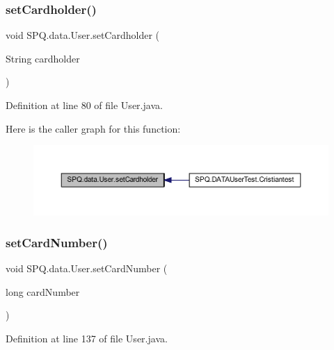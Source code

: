 \subsubsection{\texorpdfstring{set\+Cardholder()}{setCardholder()}}
{\footnotesize\ttfamily void S\+P\+Q.\+data.\+User.\+set\+Cardholder (\begin{DoxyParamCaption}\item[{String}]{cardholder }\end{DoxyParamCaption})}



Definition at line 80 of file User.\+java.

Here is the caller graph for this function\+:
\nopagebreak
\begin{figure}[H]
\begin{center}
\leavevmode
\includegraphics[width=350pt]{class_s_p_q_1_1data_1_1_user_a0fe49415c82bbbbfa0b22822f054157f_icgraph}
\end{center}
\end{figure}
\mbox{\label{class_s_p_q_1_1data_1_1_user_a6d98a72cb61e95f5417e10e0ba80afab}} 
\subsubsection{\texorpdfstring{set\+Card\+Number()}{setCardNumber()}}
{\footnotesize\ttfamily void S\+P\+Q.\+data.\+User.\+set\+Card\+Number (\begin{DoxyParamCaption}\item[{long}]{card\+Number }\end{DoxyParamCaption})}



Definition at line 137 of file User.\+java.

